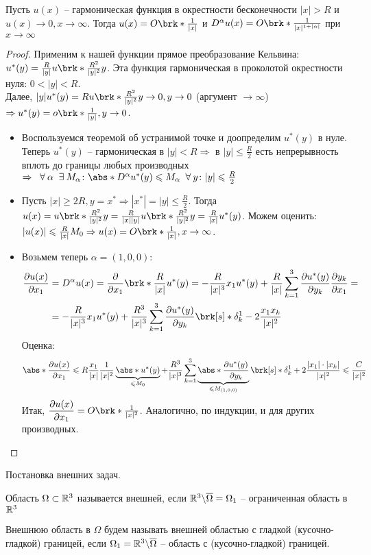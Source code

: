 \begin{theorem}
Пусть $u(x)$ -- гармоническая функция в окрестности бесконечности $|x| > R$ и $u(x) \rightarrow 0, x \rightarrow \infty$. Тогда $u(x) = O\brk*{\frac{1}{|x|}}$ и $D^\alpha u(x) = O\brk*{\frac{1}{|x|^{1+|\alpha|}}}$ при $x\rightarrow \infty$
\end{theorem}
\begin{proof}
Применим к нашей функции прямое преобразование Кельвина: $u^*(y) = \frac{R}{|y|}u\brk*{\frac{R^2}{|y|^2}y}$. Эта функция гармоническая в проколотой окрестности нуля: $0 < |y| < R$.\\
Далее, $|y|u^*(y) = R u\brk*{\frac{R^2}{|y|^2}y} \rightarrow 0, y \rightarrow 0$ (аргумент $\rightarrow \infty$) $\Rightarrow u^*(y) = o \brk*{\frac{1}{|y|}}, y \rightarrow 0$. 
\begin{itemize}
\item Воспользуемся теоремой об устранимой точке и доопределим $u^*(y)$ в нуле. Теперь $u^*(y)$ -- гармоническая в $|y| < R \Rightarrow$ в $|y| \leq \frac{R}{2}$ есть непрерывность вплоть до границы любых производных $\Rightarrow \Forall \alpha \Exists M_\alpha\colon \abs*{D^\alpha u^*(y)} \leq M_\alpha \Forall y\colon |y| \leq \frac{R}{2}$
\item Пусть $|x| \geq 2R, y = x^* \Rightarrow |x^*| = |y| \leq \frac{R}{2}$. Тогда $u(x) = u\brk*{\frac{R^2}{|y|^2}y} = \frac{R}{|x||y|} u\brk*{\frac{R^2}{|y|^2}y}  = \frac{R}{|x|} u^*(y)$. Можем оценить: $|u(x)| \leq \frac{R}{|x|} M_0 \Rightarrow u(x) = O\brk*{\frac{1}{|x|}}, x \rightarrow \infty$.
\item Возьмем теперь $\alpha = (1,0,0)$: 
\begin{align*}
\pd{u(x)}{x_1} &= D^\alpha u(x) = \pd{}{x_1} \brk*{\frac{R}{|x|} u^*(y)} = - \frac{R}{|x|^3} x_1 u^*(y) + \frac{R}{|x|} \sum_{k=1}^3 \pd{u^*(y)}{y_k} \pd{y_k}{x_1} =\\ 
&=- \frac{R}{|x|^3} x_1 u^*(y) + \frac{R^3}{|x|^3} \sum_{k=1}^3 \pd{u^*(y)}{y_k} \brk[s]*{\delta_k^1 - 2 \frac{x_1 x_k}{|x|^2}}
\end{align*}
Оценка: $$\abs*{\pd{u(x)}{x_1}} \leq R \frac{x_1}{|x|} \frac{1}{|x|^2} \underbrace{\abs*{u^*(y)}}_{\leq M_0} + \frac{R^3}{|x|^3}\sum_{k=1}^3 \underbrace{\abs*{\pd{u^*(y)}{y_k}}}_{\leq M_{(1,0,0)}} \brk[s]*{\delta_k^1 + 2 \frac{|x_1| \cdot |x_k|}{|x|^2}} \leq \frac{C}{|x|^2}$$
Итак, $\pd{u(x)}{x_1} = O \brk*{\frac{1}{|x|^2}}$. Аналогично, по индукции, и для других производных.
\end{itemize}
\end{proof}
Постановка внешних задач.
\begin{definition}
Область $\Omega \subset \mathbb{R}^3$ называется внешней, если $\mathbb{R}^3 \backslash \overline{\Omega} = \Omega_1$ -- ограниченная область в $\mathbb{R}^3$ 
\end{definition}
\begin{definition}
Внешнюю область в $\Omega$ будем называть внешней областью с гладкой (кусочно-гладкой) границей, если $\Omega_1 = \mathbb{R}^3 \backslash \overline{\Omega}$ -- область с (кусочно-гладкой) границей.
\end{definition}